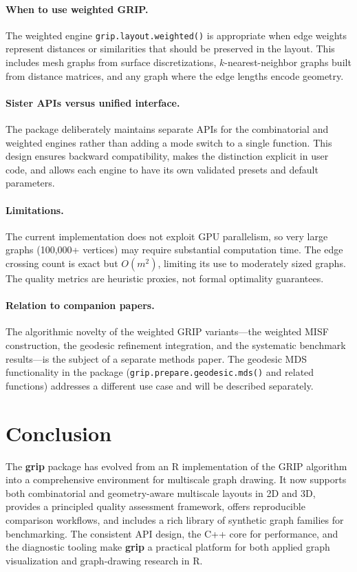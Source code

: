 \paragraph{When to use weighted GRIP.}
The weighted engine \texttt{grip.layout.weighted()} is appropriate when
edge weights represent distances or similarities that should be
preserved in the layout. This includes mesh graphs from surface
discretizations, $k$-nearest-neighbor graphs built from distance
matrices, and any graph where the edge lengths encode geometry.

\paragraph{Sister APIs versus unified interface.}
The package deliberately maintains separate APIs for the combinatorial
and weighted engines rather than adding a mode switch to a single
function. This design ensures backward compatibility, makes the
distinction explicit in user code, and allows each engine to have its
own validated presets and default parameters.

\paragraph{Limitations.}
The current implementation does not exploit GPU parallelism, so very
large graphs (100,000+ vertices) may require substantial computation
time. The edge crossing count is exact but $O(m^2)$, limiting its use
to moderately sized graphs. The quality metrics are heuristic proxies,
not formal optimality guarantees.

\paragraph{Relation to companion papers.}
The algorithmic novelty of the weighted GRIP variants---the weighted
MISF construction, the geodesic refinement integration, and the
systematic benchmark results---is the subject of a separate methods
paper. The geodesic MDS functionality in the package
(\texttt{grip.prepare.geodesic.mds()} and related functions) addresses
a different use case and will be described separately.


\section{Conclusion}\label{sec:conclusion}

The \textbf{grip} package has evolved from an R implementation of the
GRIP algorithm into a comprehensive environment for multiscale graph
drawing. It now supports both combinatorial and geometry-aware
multiscale layouts in 2D and 3D, provides a principled quality
assessment framework, offers reproducible comparison workflows, and
includes a rich library of synthetic graph families for benchmarking.
The consistent API design, the C++ core for performance, and the
diagnostic tooling make \textbf{grip} a practical platform for both
applied graph visualization and graph-drawing research in R.

